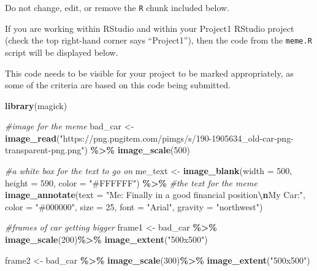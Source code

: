 \documentclass[
]{article}
\newenvironment{Shaded}{\begin{snugshade}}{\end{snugshade}}
\newcommand{\AttributeTok}[1]{\textcolor[rgb]{0.13,0.29,0.53}{#1}}
\newcommand{\CommentTok}[1]{\textcolor[rgb]{0.56,0.35,0.01}{\textit{#1}}}
\newcommand{\DecValTok}[1]{\textcolor[rgb]{0.00,0.00,0.81}{#1}}
\newcommand{\FunctionTok}[1]{\textcolor[rgb]{0.13,0.29,0.53}{\textbf{#1}}}
\newcommand{\NormalTok}[1]{#1}
\newcommand{\OtherTok}[1]{\textcolor[rgb]{0.56,0.35,0.01}{#1}}
\newcommand{\SpecialCharTok}[1]{\textcolor[rgb]{0.81,0.36,0.00}{\textbf{#1}}}
\newcommand{\StringTok}[1]{\textcolor[rgb]{0.31,0.60,0.02}{#1}}
\begin{document}
Do not change, edit, or remove the \texttt{R} chunk included below.

If you are working within RStudio and within your Project1 RStudio
project (check the top right-hand corner says ``Project1''), then the
code from the \texttt{meme.R} script will be displayed below.

This code needs to be visible for your project to be marked
appropriately, as some of the criteria are based on this code being
submitted.

\begin{Shaded}
\begin{Highlighting}[]
\FunctionTok{library}\NormalTok{(magick)}

\CommentTok{\#image for the meme}
\NormalTok{bad\_car }\OtherTok{\textless{}{-}} \FunctionTok{image\_read}\NormalTok{(}\StringTok{"https://png.pngitem.com/pimgs/s/190{-}1905634\_old{-}car{-}png{-}transparent{-}png.png"}\NormalTok{) }\SpecialCharTok{\%\textgreater{}\%}
  \FunctionTok{image\_scale}\NormalTok{(}\DecValTok{500}\NormalTok{)}

\CommentTok{\#a white box for the text to go on}
\NormalTok{me\_text }\OtherTok{\textless{}{-}} \FunctionTok{image\_blank}\NormalTok{(}\AttributeTok{width =} \DecValTok{500}\NormalTok{,}
                       \AttributeTok{height =} \DecValTok{590}\NormalTok{,}
                       \AttributeTok{color =} \StringTok{"\#FFFFFF"}\NormalTok{) }\SpecialCharTok{\%\textgreater{}\%}
  \CommentTok{\#the text for the meme}
  \FunctionTok{image\_annotate}\NormalTok{(}\AttributeTok{text =} \StringTok{"Me: Finally in a good financial position}\SpecialCharTok{\textbackslash{}n}\StringTok{My Car:"}\NormalTok{,}
                 \AttributeTok{color =} \StringTok{"\#000000"}\NormalTok{,}
                 \AttributeTok{size =} \DecValTok{25}\NormalTok{,}
                 \AttributeTok{font =} \StringTok{"Arial"}\NormalTok{,}
                 \AttributeTok{gravity =} \StringTok{"northwest"}\NormalTok{)}

\CommentTok{\#frames of car getting bigger}
\NormalTok{frame1 }\OtherTok{\textless{}{-}}\NormalTok{ bad\_car }\SpecialCharTok{\%\textgreater{}\%}
  \FunctionTok{image\_scale}\NormalTok{(}\DecValTok{200}\NormalTok{)}\SpecialCharTok{\%\textgreater{}\%}
  \FunctionTok{image\_extent}\NormalTok{(}\StringTok{"500x500"}\NormalTok{)}

\NormalTok{frame2 }\OtherTok{\textless{}{-}}\NormalTok{ bad\_car }\SpecialCharTok{\%\textgreater{}\%}
  \FunctionTok{image\_scale}\NormalTok{(}\DecValTok{300}\NormalTok{)}\SpecialCharTok{\%\textgreater{}\%}
  \FunctionTok{image\_extent}\NormalTok{(}\StringTok{"500x500"}\NormalTok{)}


\end{Highlighting}
\end{Shaded}
\end{document}
